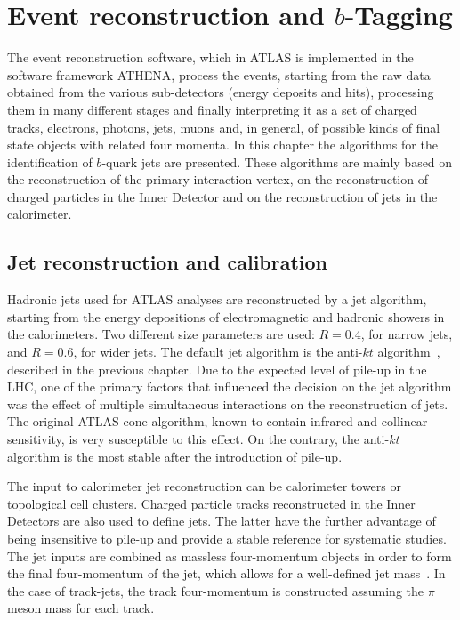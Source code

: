 %
%

\chapter{Event reconstruction and $b$-Tagging }\label{ch:reco}


The event reconstruction software, which in ATLAS is implemented in the software framework ATHENA, process the events, starting from the raw data obtained from the various sub-detectors (energy deposits and hits), processing them in many different stages and finally interpreting it as a set of charged tracks, electrons, photons, jets, muons and, in general, of possible kinds of final state objects with related four momenta.  
In this chapter the algorithms for the identification of $b$-quark jets are presented.  These algorithms are mainly based on the reconstruction of the primary interaction vertex, on the reconstruction of charged particles in the Inner Detector and on the reconstruction of jets in the calorimeter.   

\section{Jet reconstruction and calibration}\label{sec:ObjSelection}

Hadronic jets used for ATLAS analyses are reconstructed by a jet algorithm, starting from the energy depositions of electromagnetic and hadronic showers in the calorimeters.  Two different size parameters are used: $R = 0.4$, for narrow jets, and $R = 0.6$, for wider jets. The default jet algorithm is the anti-$kt$ algorithm~\cite{Asquith:1311867}, described in the previous chapter. Due to the expected level of pile-up in the LHC, one of the primary factors that influenced the decision on the jet algorithm was the effect of multiple simultaneous interactions on the reconstruction of jets. The original ATLAS cone algorithm, known to contain infrared and collinear sensitivity, is very susceptible to this effect. On the contrary, the anti-$kt$ algorithm is the most stable after the introduction of pile-up.  

The input to calorimeter jet reconstruction can be calorimeter towers or topological cell clusters. Charged particle tracks reconstructed in the Inner Detectors are also used to define jets. The latter have the further advantage of being insensitive to pile-up and provide a stable reference for systematic studies. The jet inputs are combined as massless four-momentum objects in order to form the final four-momentum of the jet, which allows for a well-defined jet mass~\cite{Busato:1271710}. In the case of track-jets, the track four-momentum is constructed assuming the $\pi$ meson mass for each track.


